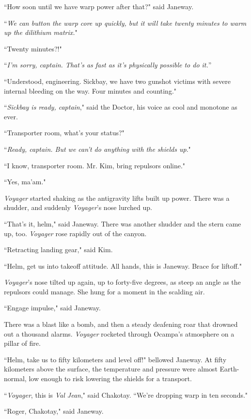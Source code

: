 \documentclass[twoside,letterpaper,12pt]{memoir}
\begin{document}
``How soon until we have warp power after that?" said Janeway.

``\textit{We can button the warp core up quickly, but it will take twenty minutes to warm up the dilithium matrix.}"

``Twenty minutes?!"

``\textit{I'm sorry, captain. That's as fast as it's physically possible to do it.}”

``Understood, engineering. Sickbay, we have two gunshot victims with severe internal bleeding on the way. Four minutes and counting."

``\textit{Sickbay is ready, captain}," said the Doctor, his voice as cool and monotone as ever.

``Transporter room, what's your status?"

``\textit{Ready, captain. But we can't do anything with the shields up}."

``I know, transporter room. Mr. Kim, bring repulsors online."

``Yes, ma'am."

\textit{Voyager} started shaking as the antigravity lifts built up power. There was a shudder, and suddenly \textit{Voyager}'s nose lurched up.

``That's it, helm," said Janeway. There was another shudder and the stern came up, too. \textit{Voyager} rose rapidly out of the canyon.

``Retracting landing gear," said Kim.

``Helm, get us into takeoff attitude. All hands, this is Janeway. Brace for liftoff."

\textit{Voyager}'s nose tilted up again, up to forty-five degrees, as steep an angle as the repulsors could manage. She hung for a moment in the scalding air.

``Engage impulse," said Janeway.

There was a blast like a bomb, and then a steady deafening roar that drowned out a thousand alarms. \textit{Voyager} rocketed through Ocampa's atmosphere on a pillar of fire.

``Helm, take us to fifty kilometers and level off!" bellowed Janeway. At fifty kilometers above the surface, the temperature and pressure were almost Earth-normal, low enough to risk lowering the shields for a transport.

``\textit{Voyager}, this is \textit{Val Jean}," said Chakotay. ``We're dropping warp in ten seconds."

``Roger, Chakotay," said Janeway.
\end{document}
